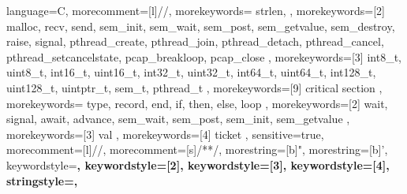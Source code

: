 {
	language=C,
	morecomment=[l]{//},
	morekeywords={
		strlen,
	},
	morekeywords=[2]{
		malloc,
		recv,
		send,
		sem_init,
		sem_wait,
		sem_post,
		sem_getvalue,
		sem_destroy,
		raise,
		signal,
		pthread_create,
		pthread_join,
		pthread_detach,
		pthread_cancel,
		pthread_setcancelstate,
		pcap_breakloop,
		pcap_close
	},
	morekeywords=[3]{
		int8_t,
		uint8_t,
		int16_t,
		uint16_t,
		int32_t,
		uint32_t,
		int64_t,
		uint64_t,
		int128_t,
		uint128_t,
		uintptr_t,
		sem_t,
		pthread_t
	},
	morekeywords=[9]{
		critical section
	},
}
{
	morekeywords={
		type,
		record,
		end,
		if,
		then,
		else,
		loop
	},
	morekeywords=[2]{
		wait,
		signal,
		await,
		advance,
		sem_wait,
		sem_post,
		sem_init,
		sem_getvalue
	},
	morekeywords=[3]{
		val
	},
	morekeywords=[4]{
		ticket
	},
	sensitive=true,
	morecomment=[l]{//},
	morecomment=[s]{/*}{*/},
	morestring=[b]",
	morestring=[b]',
	keywordstyle=\bfseries\ttfamily\color{blue},
	keywordstyle=[2]\bfseries\ttfamily\color{teal},
	keywordstyle=[3]\bfseries\ttfamily\color{olive},
	keywordstyle=[4]\bfseries\ttfamily\color{olive},
	stringstyle=\color{green}\ttfamily,
}
%

